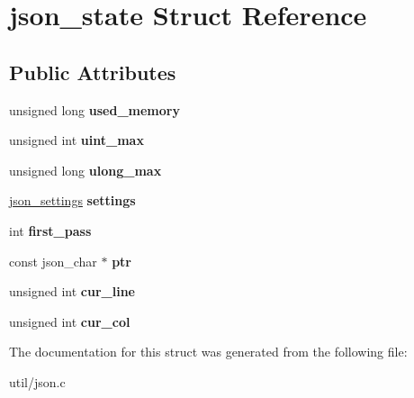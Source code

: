 \hypertarget{structjson__state}{}\section{json\+\_\+state Struct Reference}
\label{structjson__state}
\subsection*{Public Attributes}
\begin{DoxyCompactItemize}
\item 
\mbox{\label{structjson__state_ad6e7563c6104b49602606faa24e4a6df}} 
unsigned long {\bfseries used\+\_\+memory}
\item 
\mbox{\label{structjson__state_a79b4f25ddf9b76a86efb6632ef87519f}} 
unsigned int {\bfseries uint\+\_\+max}
\item 
\mbox{\label{structjson__state_a4e5c1d85255ed8f3256076f288310c7f}} 
unsigned long {\bfseries ulong\+\_\+max}
\item 
\mbox{\label{structjson__state_ab9ecde7dccb5a536ae2fa758c58cb3f2}} 
\mbox{\hyperlink{structjson__settings}{json\+\_\+settings}} {\bfseries settings}
\item 
\mbox{\label{structjson__state_ac30cd289466b1febf70b09db2429a621}} 
int {\bfseries first\+\_\+pass}
\item 
\mbox{\label{structjson__state_ab82508f74eb90fe77f6cc485eedcada4}} 
const json\+\_\+char $\ast$ {\bfseries ptr}
\item 
\mbox{\label{structjson__state_a7e6954afdc6680e00b84ffef0140c5a1}} 
unsigned int {\bfseries cur\+\_\+line}
\item 
\mbox{\label{structjson__state_a148e6e1817190bfe5517c5d8a66892d1}} 
unsigned int {\bfseries cur\+\_\+col}
\end{DoxyCompactItemize}


The documentation for this struct was generated from the following file\+:\begin{DoxyCompactItemize}
\item 
util/json.\+c\end{DoxyCompactItemize}
